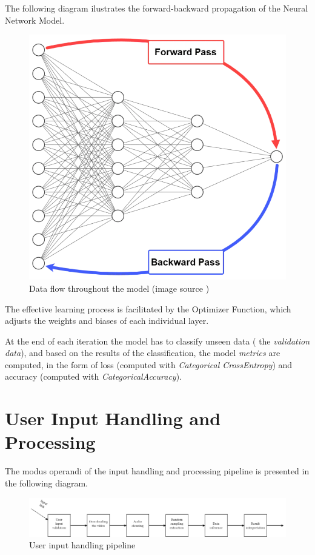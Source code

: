 The following diagram ilustrates the forward-backward propagation of the Neural Network Model.

\begin{figure}[H]
	\centering
	\includegraphics[width = 5.5in]{images/fwbw.png}
	\caption{Data flow throughout the model (image source \cite{fwbw})}
\label{data_flow}
\end{figure}


The effective learning process is facilitated by the Optimizer Function, which adjusts the weights and biases of each individual
layer.

At the end of each iteration the model has to classify unseen data ( the \textit{validation data}), and based on the results of
the classification, the model \textit{metrics} are computed, in the form of loss (computed with \textit{Categorical CrossEntropy})
and accuracy (computed with \textit{CategoricalAccuracy}).


\section{User Input Handling and Processing}

The modus operandi of the input handling and processing pipeline is presented in the following diagram.

\begin{figure}[H]
	\centering
	\includegraphics[width = 6.5in]{images/datapipe.png}
	\caption{User input handling pipeline}
\label{mo}
\end{figure}

